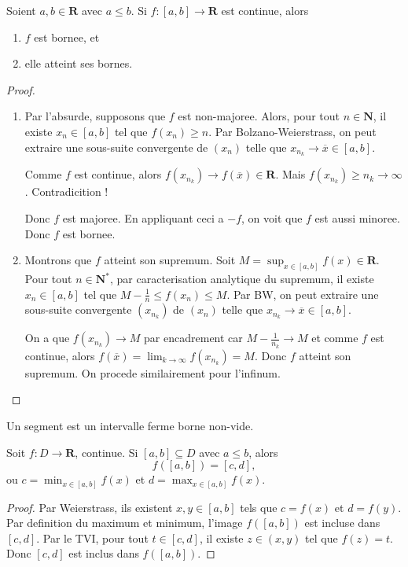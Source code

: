 \begin{theorem}[Weierstrass]
Soient $a,b\in \mathbf{R}$ avec $a\le b$. Si $f:[a,b]\to \mathbf{R}$ est continue, alors
\begin{enumerate}
\item $f$ est bornee, et
\item elle atteint ses bornes.
\end{enumerate}
\end{theorem}
\begin{proof}
\begin{enumerate}
\item Par l'absurde, supposons que $f$ est non-majoree. Alors, pour tout $n\in \mathbf{N}$, il existe $x_{n}\in[a,b]$ tel que $f(x_{n})\ge n$. Par Bolzano-Weierstrass, on peut extraire une sous-suite convergente de $(x_{n})$ telle que $x_{n_{k}}\to \overline{x}\in[a,b]$.

Comme $f$ est continue, alors $f(x_{n_{k}})\to f(\overline{x})\in \mathbf{R}$. Mais $f(x_{n_{k}})\ge n_{k}\to \infty$. Contradicition !

Donc $f$ est majoree. En appliquant ceci a $-f$, on voit que $f$ est aussi minoree. Donc $f$ est bornee.
\item Montrons que $f$ atteint son supremum. Soit $M=\sup_{x \in[a,b]}f(x)\in \mathbf{R}$. Pour tout $n\in \mathbf{N}^{*}$, par caracterisation analytique du supremum, il existe $x_{n}\in [a,b]$ tel que $M-\frac{1}{n}\le f(x_{n})\le M$. Par BW, on peut extraire une sous-suite convergente $(x_{n_{k}})$ de $(x_{n})$ telle que $x_{n_{k}}\to \overline{x}\in[a,b]$. 

On a que $f(x_{n_{k}})\to M$ par encadrement car $M-\frac{1}{n_{k}}\to M$ et comme $f$ est continue, alors $f(\overline{x})=\lim_{ k \to \infty }f(x_{n_{k}})=M$. Donc $f$ atteint son supremum. On procede similairement pour l'infinum.
\end{enumerate}
\end{proof}
\begin{definition}
Un segment est un intervalle ferme borne non-vide.
\end{definition}
\begin{corollary}
Soit $f:D\to \mathbf{R}$, continue. Si $[a,b]\subseteq D$ avec $a\le b$, alors
$$
f([a,b])=[c,d],
$$
ou $c=\min_{x \in[a,b]}f(x)$ et $d=\max_{x \in[a,b]}f(x)$.
\end{corollary}
\begin{proof}
Par Weierstrass, ils existent $x,y\in[a,b]$ tels que $c=f(x)$ et $d=f(y)$. Par definition du maximum et minimum, l'image $f([a,b])$ est incluse dans $[c,d]$. Par le TVI, pour tout $t\in[c,d]$, il existe $z\in(x,y)$ tel que $f(z)=t$. Donc $[c,d]$ est inclus dans $f([a,b])$.
\end{proof}

